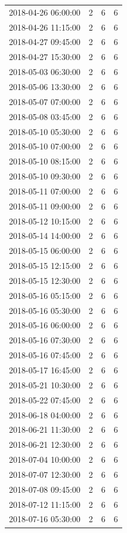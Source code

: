 \begin{tabular}{lrrr}
2018-04-26 06:00:00 & 2 & 6 & 6 \\
2018-04-26 11:15:00 & 2 & 6 & 6 \\
2018-04-27 09:45:00 & 2 & 6 & 6 \\
2018-04-27 15:30:00 & 2 & 6 & 6 \\
2018-05-03 06:30:00 & 2 & 6 & 6 \\
2018-05-06 13:30:00 & 2 & 6 & 6 \\
2018-05-07 07:00:00 & 2 & 6 & 6 \\
2018-05-08 03:45:00 & 2 & 6 & 6 \\
2018-05-10 05:30:00 & 2 & 6 & 6 \\
2018-05-10 07:00:00 & 2 & 6 & 6 \\
2018-05-10 08:15:00 & 2 & 6 & 6 \\
2018-05-10 09:30:00 & 2 & 6 & 6 \\
2018-05-11 07:00:00 & 2 & 6 & 6 \\
2018-05-11 09:00:00 & 2 & 6 & 6 \\
2018-05-12 10:15:00 & 2 & 6 & 6 \\
2018-05-14 14:00:00 & 2 & 6 & 6 \\
2018-05-15 06:00:00 & 2 & 6 & 6 \\
2018-05-15 12:15:00 & 2 & 6 & 6 \\
2018-05-15 12:30:00 & 2 & 6 & 6 \\
2018-05-16 05:15:00 & 2 & 6 & 6 \\
2018-05-16 05:30:00 & 2 & 6 & 6 \\
2018-05-16 06:00:00 & 2 & 6 & 6 \\
2018-05-16 07:30:00 & 2 & 6 & 6 \\
2018-05-16 07:45:00 & 2 & 6 & 6 \\
2018-05-17 16:45:00 & 2 & 6 & 6 \\
2018-05-21 10:30:00 & 2 & 6 & 6 \\
2018-05-22 07:45:00 & 2 & 6 & 6 \\
2018-06-18 04:00:00 & 2 & 6 & 6 \\
2018-06-21 11:30:00 & 2 & 6 & 6 \\
2018-06-21 12:30:00 & 2 & 6 & 6 \\
2018-07-04 10:00:00 & 2 & 6 & 6 \\
2018-07-07 12:30:00 & 2 & 6 & 6 \\
2018-07-08 09:45:00 & 2 & 6 & 6 \\
2018-07-12 11:15:00 & 2 & 6 & 6 \\
2018-07-16 05:30:00 & 2 & 6 & 6 \\

\end{tabular}
